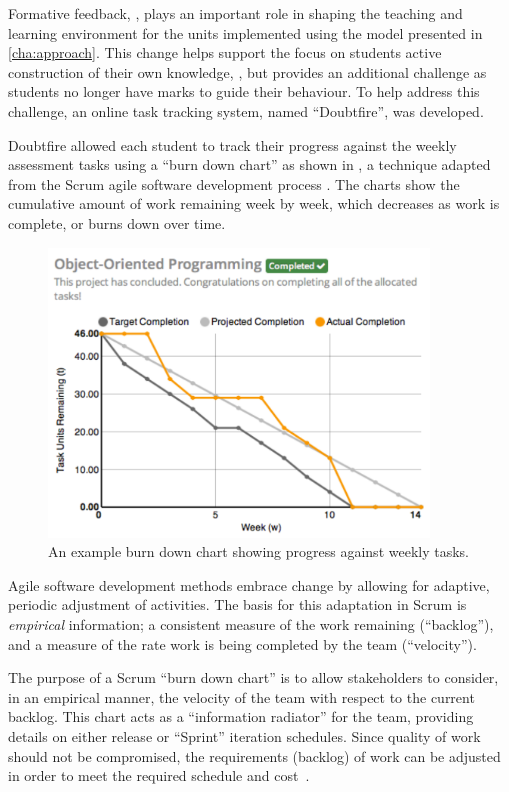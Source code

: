 Formative feedback, , plays an important role in shaping the teaching and learning environment for the units implemented using the model presented in \cref{cha:approach}. This change helps support the focus on students active construction of their own knowledge, , but provides an additional challenge as students no longer have marks to guide their behaviour. To help address this challenge, an online task tracking system, named ``Doubtfire'', was developed. 

Doubtfire allowed each student to track their progress against the weekly assessment tasks using a ``burn down chart'' as shown in , a technique adapted from the Scrum agile software development process \cite{Schwaber:2002}. The charts show the cumulative amount of work remaining week by week, which decreases as work is complete, or burns down over time.

\begin{figure}[thb]
  \centering
  \includegraphics[width=0.9\textwidth]{ExampleChart}
  \caption{An example burn down chart showing progress against weekly tasks.}
  \label{fig:example_chart}
\end{figure}


Agile software development methods \cite{Beck:2001} embrace change \cite{Beck:2000} by allowing for adaptive, periodic adjustment of activities. The basis for this adaptation in Scrum is \emph{empirical} information; a consistent measure of the work remaining (``backlog''), and a measure of the rate work is being completed by the team (``velocity'').

The purpose of a Scrum ``burn down chart'' is to allow stakeholders to consider, in an empirical manner, the velocity of the team with respect to the current backlog. This chart acts as a ``information radiator'' \cite{Cockburn:2002} for the team, providing details on either release or ``Sprint'' iteration schedules. Since quality of work should not be compromised, the requirements (backlog) of work can be adjusted in order to meet the required schedule and cost~\cite{Sutherland:2007}.

